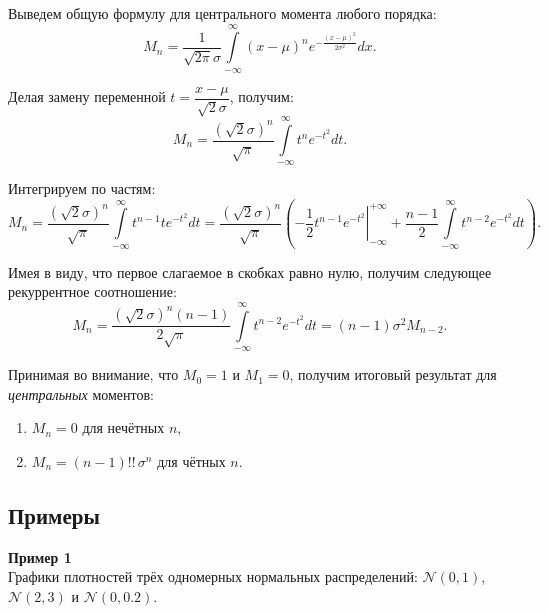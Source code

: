 \documentclass[11pt,a4paper]{article}
\providecommand{\tightlist}{%
      \setlength{\itemsep}{0pt}\setlength{\parskip}{0pt}}
\begin{document}
Выведем общую формулу для центрального момента любого порядка: \[
  M_n = \dfrac{1}{\sqrt{2\pi}\sigma} \int\limits_{-\infty}^{\infty}(x-\mu)^n e^{-\frac{(x-\mu)^2}{2\sigma^2}}dx.
\]

Делая замену переменной \(t = \dfrac{x-\mu}{\sqrt{2}\sigma}\), получим:
\[
  M_n = \dfrac{(\sqrt{2}\sigma)^n}{\sqrt{\pi}} \int\limits_{-\infty}^{\infty}t^n e^{-t^2}dt.
\]

Интегрируем по частям: \[
  M_n = \dfrac{(\sqrt{2}\sigma)^n}{\sqrt{\pi}} \int\limits_{-\infty}^{\infty}t^{n-1}t e^{-t^2}dt
  = \dfrac{(\sqrt{2}\sigma)^n}{\sqrt{\pi}} \left( \left.-\dfrac{1}{2}t^{n-1}e^{-t^2} \right|_{-\infty}^{+\infty}
  + \dfrac{n-1}{2} \int\limits_{-\infty}^{\infty}t^{n-2} e^{-t^2}dt \right).
\]

Имея в виду, что первое слагаемое в скобках равно нулю, получим
следующее рекуррентное соотношение: \[
  M_n = \dfrac{(\sqrt{2}\sigma)^n (n-1)}{2\sqrt{\pi}} \int\limits_{-\infty}^{\infty}t^{n-2} e^{-t^2}dt 
  = (n-1) \sigma^2 M_{n-2}.
\]

    Принимая во внимание, что \(M_0=1\) и \(M_1=0\), получим итоговый
результат для \emph{центральных} моментов:

\begin{enumerate}
\def\labelenumi{\arabic{enumi}.}
\tightlist
\item
  \(M_n = 0\) для нечётных \(n\),
\item
  \(M_n = (n-1)!!\,\sigma^n\) для чётных \(n\).
\end{enumerate}

    \hypertarget{ux43fux440ux438ux43cux435ux440ux44b}{%
\subsection{Примеры}\label{ux43fux440ux438ux43cux435ux440ux44b}}

\textbf{Пример 1}\\
Графики плотностей трёх одномерных нормальных распределений:
\(\mathcal{N}(0, 1)\), \(\mathcal{N}(2, 3)\) и \(\mathcal{N}(0, 0.2)\).
\end{document}
